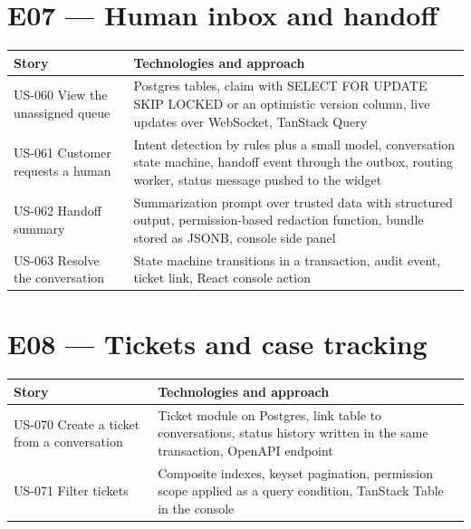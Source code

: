 \section{E07 --- Human inbox and handoff}

{\small
\begin{longtable}{@{}>{\raggedright\arraybackslash}p{}>{\raggedright\arraybackslash}p{}@{}}
\toprule
\textbf{Story} & \textbf{Technologies and approach} \\
\midrule
\endhead
\bottomrule
\endfoot
US-060 View the unassigned queue & Postgres tables, claim with SELECT FOR UPDATE SKIP LOCKED or an optimistic version column, live updates over WebSocket, TanStack Query \\
US-061 Customer requests a human & Intent detection by rules plus a small model, conversation state machine, handoff event through the outbox, routing worker, status message pushed to the widget \\
US-062 Handoff summary & Summarization prompt over trusted data with structured output, permission-based redaction function, bundle stored as JSONB, console side panel \\
US-063 Resolve the conversation & State machine transitions in a transaction, audit event, ticket link, React console action \\
\end{longtable}
}

\section{E08 --- Tickets and case tracking}

{\small
\begin{longtable}{@{}>{\raggedright\arraybackslash}p{}>{\raggedright\arraybackslash}p{}@{}}
\toprule
\textbf{Story} & \textbf{Technologies and approach} \\
\midrule
\endhead
\bottomrule
\endfoot
US-070 Create a ticket from a conversation & Ticket module on Postgres, link table to conversations, status history written in the same transaction, OpenAPI endpoint \\
US-071 Filter tickets & Composite indexes, keyset pagination, permission scope applied as a query condition, TanStack Table in the console \\
\end{longtable}
}

